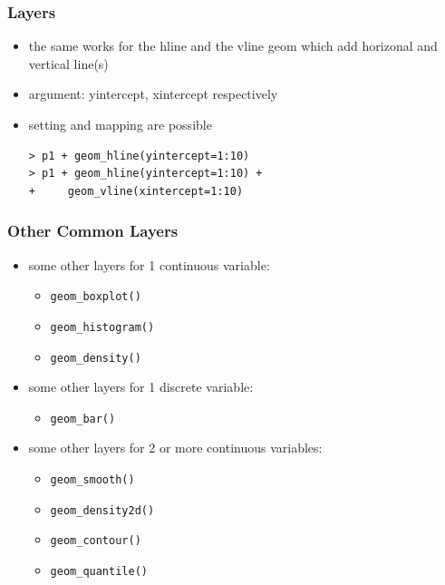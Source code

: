 \documentclass[xcolor={table},c]{beamer}
\begin{document}
\begin{frame}[fragile]\frametitle{Layers}
  \begin{itemize}
  \item the same works for the hline and the vline geom which add horizonal and vertical line(s)
  \item argument: yintercept, xintercept respectively
  \item setting and mapping are possible
\begin{verbatim}
> p1 + geom_hline(yintercept=1:10)
> p1 + geom_hline(yintercept=1:10) + 
+     geom_vline(xintercept=1:10)
\end{verbatim}
  \end{itemize}
\begin{center}
\end{center}
\end{frame}

\begin{frame}[fragile]\frametitle{Other Common Layers}
\begin{itemize}
\item some other layers for 1 continuous variable:
  \begin{itemize}
  \item \texttt{geom\_boxplot()}
  \item \texttt{geom\_histogram()}
  \item \texttt{geom\_density()}
  \end{itemize}
\item some other layers for 1 discrete variable:
  \begin{itemize}
  \item \texttt{geom\_bar()}
  \end{itemize}
\item some other layers for 2 or more continuous variables:
  \begin{itemize}
  \item \texttt{geom\_smooth()}
  \item \texttt{geom\_density2d()}
  \item \texttt{geom\_contour()}
  \item \texttt{geom\_quantile()}
  \end{itemize}
\end{itemize}
\end{frame}
\end{document}
